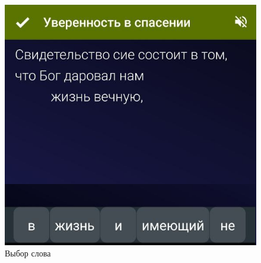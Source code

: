 \documentclass[t,aspectratio=169,14pt]{beamer}  %
\begin{document}
\begin{frame}[c]
\begin{multicols}{2}
\begin{center}
\begin{figure}
			\includegraphics[height=0.55\textheight]{remember-me-card-pick}
			\caption{Выбор слова}
			\end{figure}		
		\end{center}
	 \end{multicols}
\end{frame}
\end{document}
